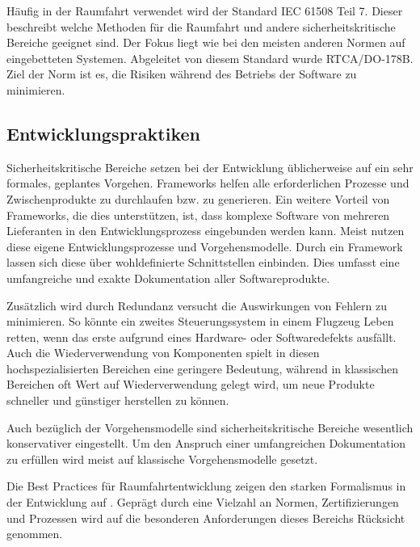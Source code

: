 Häufig in der Raumfahrt verwendet wird der Standard IEC 61508 Teil 7.
Dieser beschreibt welche Methoden für die Raumfahrt und andere sicherheitskritische Bereiche geeignet sind.
Der Fokus liegt wie bei den meisten anderen Normen auf eingebetteten Systemen.
Abgeleitet von diesem Standard wurde RTCA/DO-178B.
Ziel der Norm ist es, die Risiken während des Betriebs der Software zu minimieren.
\parencite[Vgl.][S. 40]{Carpenter:2014aa}

\subsection{Entwicklungspraktiken} %

Sicherheitskritische Bereiche setzen bei der Entwicklung üblicherweise auf ein sehr formales, geplantes Vorgehen.
Frameworks helfen alle erforderlichen Prozesse und Zwischenprodukte zu durchlaufen bzw. zu generieren.
Ein weitere Vorteil von Frameworks, die dies unterstützen, ist, dass komplexe Software von mehreren Lieferanten in den Entwicklungsprozess eingebunden werden kann.
Meist nutzen diese eigene Entwicklungsprozesse und Vorgehensmodelle.
Durch ein Framework lassen sich diese über wohldefinierte Schnittstellen einbinden.
Dies umfasst eine umfangreiche und exakte Dokumentation aller Softwareprodukte.
\parencite[Vgl.][S. 39]{Carpenter:2014aa}

Zusätzlich wird durch Redundanz versucht die Auswirkungen von Fehlern zu minimieren.
So könnte ein zweites Steuerungssystem in einem Flugzeug Leben retten, wenn das erste aufgrund eines Hardware- oder Softwaredefekts ausfällt.
Auch die Wiederverwendung von Komponenten spielt in diesen hochspezialisierten Bereichen eine geringere Bedeutung, während in klassischen Bereichen oft Wert auf Wiederverwendung gelegt wird, um neue Produkte schneller und günstiger herstellen zu können.
\parencite[Vgl.][S. 39]{Carpenter:2014aa}

Auch bezüglich der Vorgehensmodelle sind sicherheitskritische Bereiche wesentlich konservativer eingestellt.
Um den Anspruch einer umfangreichen Dokumentation zu erfüllen wird meist auf klassische Vorgehensmodelle gesetzt.
\parencite[Vgl.][S. 39]{Carpenter:2014aa}

Die Best Practices für Raumfahrtentwicklung zeigen den starken Formalismus in der Entwicklung auf \parencite[vgl.][S. 269ff]{Hersman:2010aa}.
Geprägt durch eine Vielzahl an Normen, Zertifizierungen und Prozessen wird auf die besonderen Anforderungen dieses Bereichs Rücksicht genommen.

